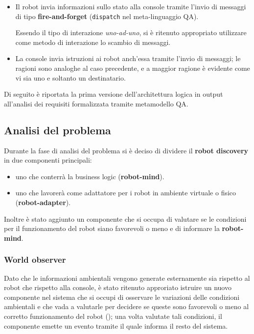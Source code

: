 \begin{itemize}
  \item
    Il robot invia informazioni sullo stato alla console tramite l'invio di messaggi di tipo \textbf{fire-and-forget}
    (\texttt{dispatch} nel meta-linguaggio QA).

    Essendo il tipo di interazione \textit{uno-ad-uno}, si è ritenuto appropriato utilizzare come metodo di interazione lo scambio di messaggi.

  \item
    La console invia istruzioni ai robot anch'essa tramite l'invio di messaggi;
    le ragioni sono analoghe al caso precedente,
    e a maggior ragione è evidente come vi sia uno e soltanto un destinatario.

\end{itemize}

\clearpage

Di seguito è riportata la prima versione dell'architettura logica in output all'analisi dei requisiti formalizzata tramite metamodello QA\@.



\subsection{Analisi del problema}

Durante la fase di analisi del problema si è deciso di dividere il \textbf{robot discovery} in due componenti principali:

\begin{itemize}
  \item uno che conterrà la business logic (\textbf{robot-mind}).
  \item uno che lavorerà come adattatore per i robot in ambiente virtuale o fisico (\textbf{robot-adapter}).
\end{itemize}

Inoltre è stato aggiunto un componente che si occupa di valutare se le condizioni per il funzionamento del robot siano favorevoli o meno e di informare la \textbf{robot-mind}.

\subsubsection{World observer}

Dato che le informazioni ambientali vengono generate esternamente sia rispetto al robot che rispetto alla console,
è stato ritenuto approriato istruire un nuovo componente nel sistema che si occupi di osservare le variazioni delle condizioni ambientali
e che vada a valutarle per decidere se queste sono favorevoli o meno al corretto funzionamento del robot ();
una volta valutate tali condizioni, il componente emette un evento tramite il quale informa il resto del sistema.

